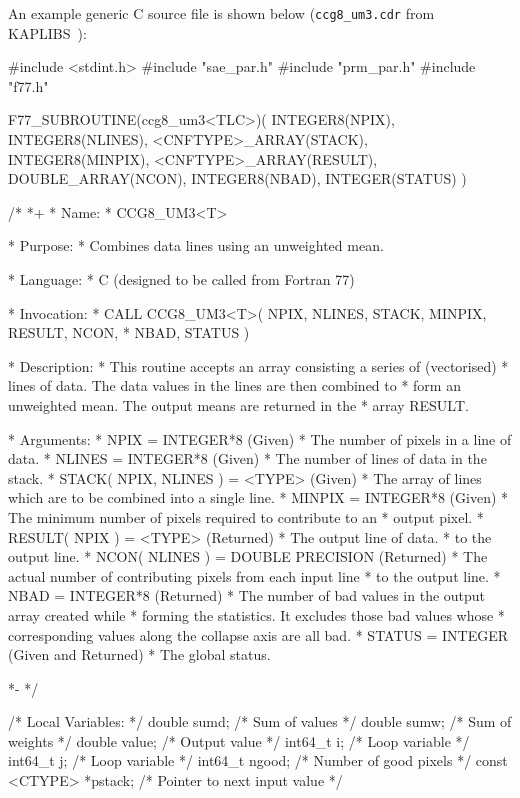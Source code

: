 \documentclass[twoside,11pt,nolof]{starlink}
\providecommand{\KAPLIBS}{{\footnotesize KAPLIBS}\normalsize}
\begin{document}
An example generic C source file is shown below (\verb+ccg8_um3.cdr+ from
 \KAPLIBS\ ):
\begin{terminalv}

#include <stdint.h>
#include "sae_par.h"
#include "prm_par.h"
#include "f77.h"

F77_SUBROUTINE(ccg8_um3<TLC>)( INTEGER8(NPIX), INTEGER8(NLINES),
                               <CNFTYPE>_ARRAY(STACK), INTEGER8(MINPIX),
                               <CNFTYPE>_ARRAY(RESULT), DOUBLE_ARRAY(NCON),
                               INTEGER8(NBAD), INTEGER(STATUS) ){
/*
*+
*  Name:
*     CCG8_UM3<T>

*  Purpose:
*     Combines data lines using an unweighted mean.

*  Language:
*     C (designed to be called from Fortran 77)

*  Invocation:
*     CALL CCG8_UM3<T>( NPIX, NLINES, STACK, MINPIX, RESULT, NCON,
*                       NBAD, STATUS )

*  Description:
*     This routine accepts an array consisting a series of (vectorised)
*     lines of data.  The data values in the lines are then combined to
*     form an unweighted mean.  The output means are returned in the
*     array RESULT.

*  Arguments:
*     NPIX = INTEGER*8 (Given)
*        The number of pixels in a line of data.
*     NLINES = INTEGER*8 (Given)
*        The number of lines of data in the stack.
*     STACK( NPIX, NLINES ) = <TYPE> (Given)
*        The array of lines which are to be combined into a single line.
*     MINPIX = INTEGER*8 (Given)
*        The minimum number of pixels required to contribute to an
*        output pixel.
*     RESULT( NPIX ) = <TYPE> (Returned)
*        The output line of data.
*        to the output line.
*     NCON( NLINES ) = DOUBLE PRECISION (Returned)
*        The actual number of contributing pixels from each input line
*        to the output line.
*     NBAD = INTEGER*8 (Returned)
*        The number of bad values in the output array created while
*        forming the statistics.  It excludes those bad values whose
*        corresponding values along the collapse axis are all bad.
*     STATUS = INTEGER (Given and Returned)
*        The global status.

*-
*/

/* Local Variables: */
   double sumd;          /* Sum of values */
   double sumw;          /* Sum of weights */
   double value;         /* Output value */
   int64_t i;            /* Loop variable */
   int64_t j;            /* Loop variable */
   int64_t ngood;        /* Number of good pixels */
   const <CTYPE> *pstack; /* Pointer to next input value */

}
\end{terminalv}
\end{document}
